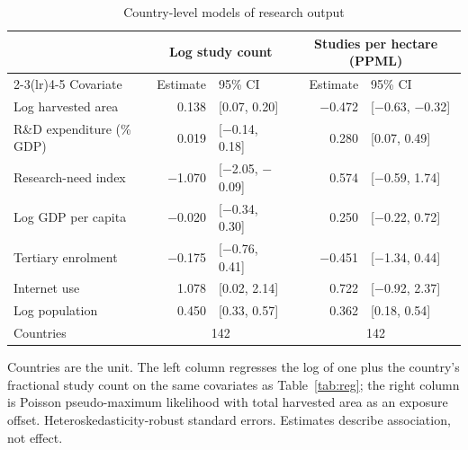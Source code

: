 \documentclass[ASNA,twocolumn]{USG}
\begin{document}
\begin{table}[t]
\centering
\footnotesize
\caption{Country-level models of research output}
\label{tab:countrylevel}
\begin{tabular*}{\textwidth}{@{\extracolsep\fill}l r@{\hspace{6pt}}l r@{\hspace{6pt}}l@{}}
\toprule
& \multicolumn{2}{c}{Log study count} & \multicolumn{2}{c}{Studies per hectare (PPML)} \\
\cmidrule(lr){2-3}\cmidrule(lr){4-5}
Covariate & Estimate & 95\% CI & Estimate & 95\% CI \\
\midrule
Log harvested area & 0.138 & [0.07, 0.20] & $-$0.472 & [$-$0.63, $-$0.32] \\
R\&D expenditure (\% GDP) & 0.019 & [$-$0.14, 0.18] & 0.280 & [0.07, 0.49] \\
Research-need index & $-$1.070 & [$-$2.05, $-$0.09] & 0.574 & [$-$0.59, 1.74] \\
Log GDP per capita & $-$0.020 & [$-$0.34, 0.30] & 0.250 & [$-$0.22, 0.72] \\
Tertiary enrolment & $-$0.175 & [$-$0.76, 0.41] & $-$0.451 & [$-$1.34, 0.44] \\
Internet use & 1.078 & [0.02, 2.14] & 0.722 & [$-$0.92, 2.37] \\
Log population & 0.450 & [0.33, 0.57] & 0.362 & [0.18, 0.54] \\
\midrule
Countries & \multicolumn{2}{c}{142} & \multicolumn{2}{c}{142} \\
\bottomrule
\end{tabular*}
\begin{tablenotes}
\item[] Countries are the unit. The left column regresses the log of one plus the country's fractional study count on the same covariates as Table~\ref{tab:reg}; the right column is Poisson pseudo-maximum likelihood with total harvested area as an exposure offset. Heteroskedasticity-robust standard errors. Estimates describe association, not effect.
\end{tablenotes}
\end{table}
\end{document}
